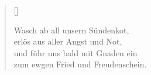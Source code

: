 \begin{center}
\settowidth{\versewidth}{Der, vor dem die Welt erschrickt,}
\begin{verse}[\versewidth]
  
 Wasch ab all unsern Sündenkot,\\
erlös aus aller Angst und Not,\\
und führ uns bald mit Gnaden ein\\
zum ewgen Fried und Freudenschein.

\end{verse}
\end{center}


